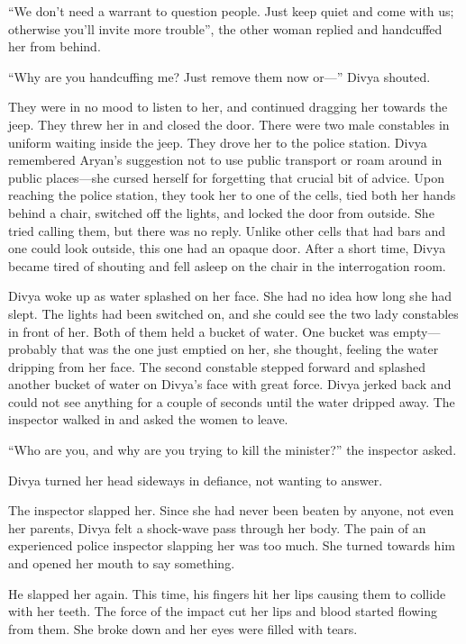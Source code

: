 “We don't need a warrant to question people. Just keep quiet and come with us;
otherwise you'll invite more trouble”, the other woman replied and handcuffed
her from behind.

“Why are you handcuffing me? Just remove them now or—” Divya shouted.

They were in no mood to listen to her, and continued dragging her towards the
jeep. They threw her in and closed the door. There were two male constables in
uniform waiting inside the jeep. They drove her to the police station. Divya
remembered Aryan's suggestion not to use public transport or roam around in
public places—she cursed herself for forgetting that crucial bit of advice. Upon
reaching the police station, they took her to one of the cells, tied both her
hands behind a chair, switched off the lights, and locked the door from outside.
She tried calling them, but there was no reply. Unlike other cells that had bars
and one could look outside, this one had an opaque door. After a short time,
Divya became tired of shouting and fell asleep on the chair in the interrogation
room.

Divya woke up as water splashed on her face. She had no idea how long she had
slept. The lights had been switched on, and she could see the two lady
constables in front of her. Both of them held a bucket of water. One bucket
was empty—probably that was the one just emptied on her, she thought, feeling
the water dripping from her face. The second constable stepped forward and
splashed another bucket of water on Divya's face with great force. Divya jerked
back and could not see anything for a couple of seconds until the water dripped
away. The inspector walked in and asked the women to leave.

“Who are you, and why are you trying to kill the minister?” the inspector asked.

Divya turned her head sideways in defiance, not wanting to answer.

The inspector slapped her. Since she had never been beaten by anyone, not even her
parents, Divya felt a shock-wave pass through her body. The pain of an
experienced police inspector slapping her was too much. She turned towards him
and opened her mouth to say something.

He slapped her again. This time, his fingers hit her lips causing them to
collide with her teeth. The force of the impact cut her lips and blood started
flowing from them.  She broke down and her eyes were filled with tears.

